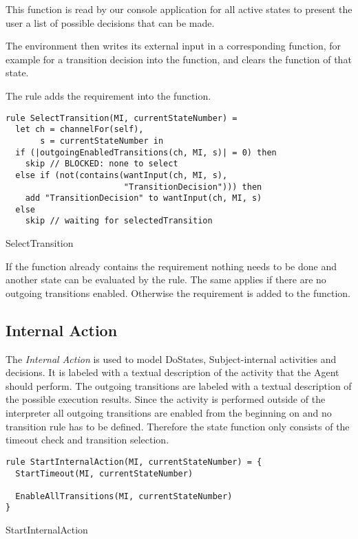 This function is read by our console application for all active states
to present the user a list of possible decisions that can be made.

The environment then writes its external input in a corresponding function, for
example for a transition decision into the  function, and
clears the  function of that state.

The  rule adds the 
requirement into the  function.


\begin{listing}[H]
\begin{verbatim}
rule SelectTransition(MI, currentStateNumber) =
  let ch = channelFor(self),
       s = currentStateNumber in
  if (|outgoingEnabledTransitions(ch, MI, s)| = 0) then
    skip // BLOCKED: none to select
  else if (not(contains(wantInput(ch, MI, s),
                        "TransitionDecision"))) then
    add "TransitionDecision" to wantInput(ch, MI, s)
  else
    skip // waiting for selectedTransition
\end{verbatim}
\caption{SelectTransition}
\label{lst:shortasm:SelectTransition}
\end{listing}


If the  function already contains the
 requirement nothing needs to be done and another
state can be evaluated by the  rule.
The same applies if there are no outgoing transitions enabled.
Otherwise the requirement is added to the  function.


\subsection{Internal Action}


The \emph{Internal Action} is used to model DoStates, Subject-internal activities and decisions.
It is labeled with a textual description of the activity that the Agent should perform.
The outgoing transitions are labeled with a textual description of the possible execution results.
Since the activity is performed outside of the interpreter all outgoing transitions are enabled from the beginning on and no transition rule has to be defined.
Therefore the state function only consists of the timeout check and transition selection.


\begin{listing}[H]
\begin{verbatim}
rule StartInternalAction(MI, currentStateNumber) = {
  StartTimeout(MI, currentStateNumber)

  EnableAllTransitions(MI, currentStateNumber)
}
\end{verbatim}
\caption{StartInternalAction}
\label{lst:shortasm:StartInternalAction}
\end{listing}



